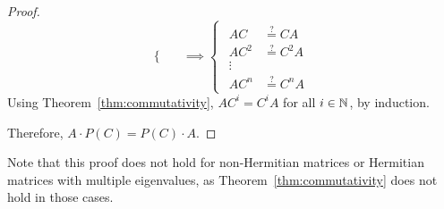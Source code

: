 \documentclass{zc-ust-hw}
\theoremstyle{definition}
\begin{document}
\begin{enumerate}
\begin{proof}
\begin{equation}
\begin{cases}
\begin{split}
          \end{split}
        \end{cases}
        \implies
        \begin{cases}
          \begin{split}
            AC &\overset{?}{=} CA \\
            AC^2 &\overset{?}{=} C^2A \\
            \vdots \\
            AC^n &\overset{?}{=} C^nA
          \end{split}
        \end{cases}
      \end{equation}
      Using Theorem~\ref{thm:commutativity}, $AC^i = C^iA$ for all $i \in \mathbb{N}$, by induction.

      Therefore, $A\cdot P(C)=P(C)\cdot A$.
    \end{proof}
    Note that this proof does not hold for non-Hermitian matrices or Hermitian
    matrices with multiple eigenvalues, as Theorem~\ref{thm:commutativity} does
    not hold in those cases.

\end{enumerate}
\end{document}
